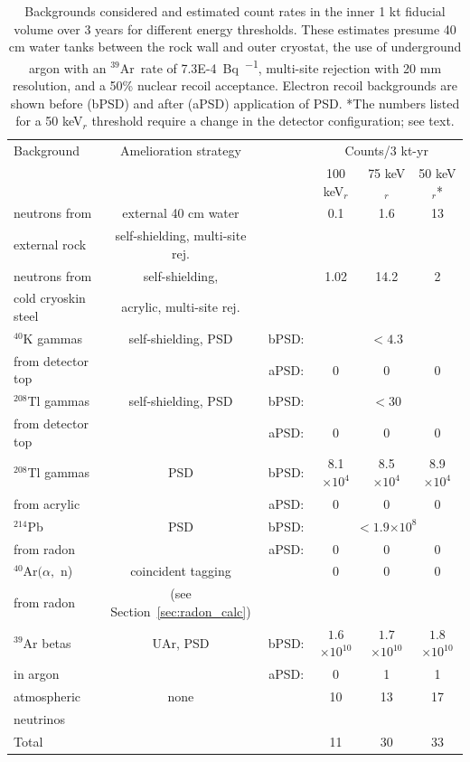 \documentclass[a4paper,11pt]{article}
\newcommand{\artn}{$^{39}$Ar}
\newcommand{\alphan}{$(\alpha,$ n)}
\newcommand{\uar}{UAr}
\begin{document}
\begin{table}[t]
\begin{tabular}{ l c c c c c}
Background  & Amelioration strategy & & \multicolumn{3}{c}{Counts/3 kt-yr} \\
 & & & 100 keV$_r$ & 75 keV$_r$ & 50 keV$_r$*\\
\hline
  neutrons from  & external 40 cm water & & 0.1 & 1.6 & 13  \\
  external rock & self-shielding, multi-site rej. & & & & \\[8pt]
 neutrons from & self-shielding, & & 1.02 & 14.2 & 2 \\
  cold cryoskin steel & acrylic, multi-site rej. & &  & & \\[8pt]
  $^{40}$K gammas & self-shielding, PSD & bPSD: & \multicolumn{3}{c}{$<4.3$} \\
  from detector top & & aPSD: & 0 & 0 & 0 \\[8pt]
$^{208}$Tl gammas & self-shielding, PSD & bPSD: & \multicolumn{3}{c}{$<30$} \\
from detector top & & aPSD: & 0 & 0 & 0\\[8pt]
$^{208}$Tl gammas & PSD & bPSD: & 8.1$\times10^4$ & 8.5$\times10^4$ & 8.9$\times10^4$ \\
from acrylic & & aPSD: & 0 & 0 & 0 \\[8pt]
$^{214}$Pb & PSD & bPSD: & \multicolumn{3}{c}{$< 1.9$$\times10^8$} \\
 from radon & & aPSD: & 0 & 0 & 0 \\[8pt]
$^{40}$Ar\alphan & coincident tagging & & 0 & 0 & 0 \\
from radon& (see Section~\ref{sec:radon_calc}) & & & & \\[8pt]
$^{39}$Ar betas & \uar, PSD & bPSD: & $1.6$$\times10^{10}$ & $1.7$$\times10^{10}$ & $1.8$$\times10^{10}$\\
in argon & & aPSD: & 0 & 1 & 1 \\[8pt]
atmospheric & none & & 10 & 13 & 17 \\
neutrinos & & & & &\\
\hline
Total & & & 11 & 30 & 33\\
\hline
\end{tabular}
\caption{Backgrounds considered and estimated count rates in the inner 1 kt fiducial volume over 3 years for different energy thresholds.  These estimates presume 40 cm water tanks between the rock wall and outer cryostat, the use of underground argon with an \artn~rate of \SI{7.3E-4}{\becquerel\per\kgar}, multi-site rejection with 20 mm resolution, and a 50\% nuclear recoil acceptance. Electron recoil backgrounds are shown before (bPSD) and after (aPSD) application of PSD. *The numbers listed for a 50 keV$_r$ threshold require a change in the detector configuration; see text.}
\label{table:DUNE}
\end{table}
\end{document}
